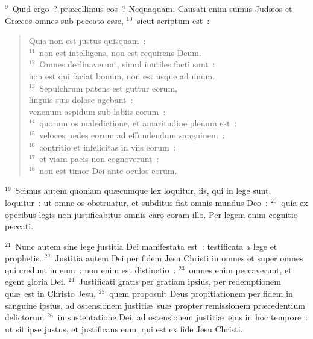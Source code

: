 ${}^{9}$~Quid ergo~? pr\ae cellimus eos~? Nequaquam. Causati enim sumus Jud\ae os et Gr\ae cos omnes sub peccato esse,
${}^{10}$~sicut scriptum est~: \begin{flushleft}\begin{verse}Quia non est justus quisquam~:\\
${}^{11}$~non est intelligens, non est requirens Deum.\\
${}^{12}$~Omnes declinaverunt, simul inutiles facti sunt~:\\ non est qui faciat bonum, non est usque ad unum.\\
${}^{13}$~Sepulchrum patens est guttur eorum,\\ linguis suis dolose agebant~:\\ venenum aspidum sub labiis eorum~:\\
${}^{14}$~quorum os maledictione, et amaritudine plenum est~:\\
${}^{15}$~veloces pedes eorum ad effundendum sanguinem~:\\
${}^{16}$~contritio et infelicitas in viis eorum~:\\
${}^{17}$~et viam pacis non cognoverunt~:\\
${}^{18}$~non est timor Dei ante oculos eorum.\end{verse}\end{flushleft}


${}^{19}$~Scimus autem quoniam qu\ae cumque lex loquitur, iis, qui in lege sunt, loquitur~: ut omne os obstruatur, et subditus fiat omnis mundus Deo~:
${}^{20}$~quia ex operibus legis non justificabitur omnis caro coram illo. Per legem enim cognitio peccati.


${}^{21}$~Nunc autem sine lege justitia Dei manifestata est~: testificata a lege et prophetis.
${}^{22}$~Justitia autem Dei per fidem Jesu Christi in omnes et super omnes qui credunt in eum~: non enim est distinctio~:
${}^{23}$~omnes enim peccaverunt, et egent gloria Dei.
${}^{24}$~Justificati gratis per gratiam ipsius, per redemptionem qu\ae\ est in Christo Jesu,
${}^{25}$~quem proposuit Deus propitiationem per fidem in sanguine ipsius, ad ostensionem justiti\ae\ su\ae\ propter remissionem pr\ae cedentium delictorum
${}^{26}$~in sustentatione Dei, ad ostensionem justiti\ae\ ejus in hoc tempore~: ut sit ipse justus, et justificans eum, qui est ex fide Jesu Christi.


